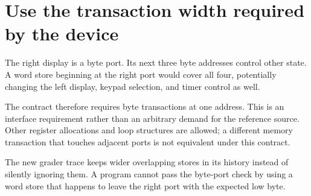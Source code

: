 \section{Use the transaction width required by the
  device}\label{005-seven-segment-counter-p06-use-the-transaction-width-required-by-the-device}

The right display is a byte port. Its next three byte addresses control
other state. A word store beginning at the right port would cover all
four, potentially changing the left display, keypad selection, and timer
control as well.

The contract therefore requires byte transactions at one address. This
is an interface requirement rather than an arbitrary demand for the
reference source. Other register allocations and loop structures are
allowed; a different memory transaction that touches adjacent ports is
not equivalent under this contract.

The new grader trace keeps wider overlapping stores in its history
instead of silently ignoring them. A program cannot pass the byte-port
check by using a word store that happens to leave the right port with
the expected low byte.
